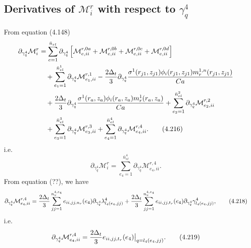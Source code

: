 \documentclass{article}
\begin{document}
\subsection{Derivatives of $\mathcal{M}_i^r$ with respect to $\gamma_q^4$} %
From equation (4.148)
\begin{align}
\partial_{\gamma_q^4}\mathcal{M}_i^r &= \sum_{e=1}^{\bar{n}_{el}} \partial_{\gamma_q^4} \left[ \mathcal{M}_{e,ii}^{r,0a} + \mathcal{M}_{e,ii}^{r,0b} + \mathcal{M}_{e,ii}^{r,0c} + \mathcal{M}_{e,ii}^{r,0d} \right] \nonumber\\
&\quad + \sum_{e_1=1}^{\bar{n}_{el}^1} \partial_{\gamma_q^4} \mathcal{M}_{e_1,ii}^{r,1} 
- \frac{2\Delta_t}{3} \partial_{\gamma_q^4} \frac{\sigma^1(r_{j1},z_{j1}) \phi_i(r_{j1},z_{j1}) m_r^{1,n}(r_{j1},z_{j1})}{Ca} \nonumber\\
&\quad + \frac{2\Delta_t}{3} \partial_{\gamma_q^4} \frac{\sigma^1(r_a,z_a) \phi_i(r_a,z_a) m_r^{1}(r_a,z_a)}{Ca} 
+ \sum_{e_2=1}^{\bar{n}_{el}^2} \partial_{\gamma_q^4} \mathcal{M}_{e_2,ii}^{r,2} \nonumber\\
&\quad + \sum_{e_3=1}^{\bar{n}_{el}^3} \partial_{\gamma_q^4} \mathcal{M}_{e_3,ii}^{r,3} 
+ \sum_{e_4=1}^{\bar{n}_{el}^4} \partial_{\gamma_q^4} \mathcal{M}_{e_4,ii}^{r,4}. \tag{4.216}
\end{align}
i.e.
\begin{equation}
\partial_{\gamma_q^4}\mathcal{M}_i^r = \sum_{e_4=1}^{\bar{n}_{el}^4} \partial_{\gamma_q^4} \mathcal{M}_{e_4,ii}^{r,4}. \tag{4.217}
\end{equation}
From equation (??), we have
\begin{equation}
\partial_{\gamma_q^4}\mathcal{M}_{e_4,ii}^{r,4} = \frac{2\Delta_t}{3} \sum_{jj=1}^{n_v^{4,e_4}} e_{ii,jj,n_r}(e_4) \partial_{\gamma_q^4} \lambda_{l_4(e_4,jj)}^4 
+ \frac{2\Delta_t}{3} \sum_{jj=1}^{n_v^{4,e_4}} e_{ii,jj,t_r}(e_4) \partial_{\gamma_q^4} \gamma_{l_4(e_4,jj)}^4, \tag{4.218}
\end{equation}
i.e.
\begin{equation}
\partial_{\gamma_q^4}\mathcal{M}_{e_4,ii}^{r,4} = \frac{2\Delta_t}{3} e_{ii,jj,t_r}(e_4) \big|_{q=l_4(e_4,jj)}. \tag{4.219}
\end{equation}
\end{document}
